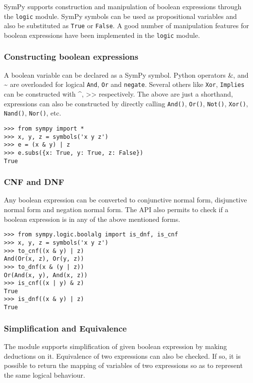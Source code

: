 
SymPy supports construction and manipulation of boolean expressions
through the \texttt{logic} module. SymPy symbols can be used as
propositional variables and also be substituted as \texttt{True}
or \texttt{False}. A good number of manipulation features for boolean
expressions have been implemented in the \texttt{logic} module.

\subsubsection{Constructing boolean expressions}

A boolean variable can be declared as a SymPy symbol. Python
operators \&, \textbar{} and \textasciitilde{} are overloaded for logical \texttt{And},
\texttt{Or} and \texttt{negate}. Several others like \texttt{Xor},
\texttt{Implies} can be constructed with \^{}, \textgreater\textgreater{} respectively.
The above are just a shorthand, expressions can also be constructed
by directly calling \verb|And()|, \verb|Or()|, \verb|Not()|,
\verb|Xor()|, \verb|Nand()|, \verb|Nor()|, etc.

\begin{verbatim}
>>> from sympy import *
>>> x, y, z = symbols('x y z')
>>> e = (x & y) | z
>>> e.subs({x: True, y: True, z: False})
True
\end{verbatim}

\subsubsection{CNF and DNF}

Any boolean expression can be converted to conjunctive normal
form, disjunctive normal form and negation normal form. The
API also permits to check if a boolean expression is in any
of the above mentioned forms.

\begin{verbatim}
>>> from sympy.logic.boolalg import is_dnf, is_cnf
>>> x, y, z = symbols('x y z')
>>> to_cnf((x & y) | z)
And(Or(x, z), Or(y, z))
>>> to_dnf(x & (y | z))
Or(And(x, y), And(x, z))
>>> is_cnf((x | y) & z)
True
>>> is_dnf((x & y) | z)
True
\end{verbatim}

\subsubsection{Simplification and Equivalence}

The module supports simplification of given boolean expression
by making deductions on it. Equivalence of two expressions can
also be checked. If so, it is possible to return the mapping of
variables of two expressions so as to represent the
same logical behaviour.

